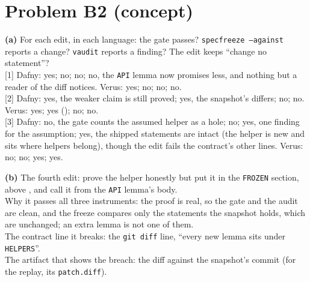 \documentclass[11pt]{article}
\begin{document}
\section*{Problem B2 (concept)}\label{ans:B2}
\begin{answer}
\textbf{(a)} For each edit, in each language: the gate passes? \texttt{specfreeze
--against} reports a change? \texttt{vaudit} reports a finding? The edit keeps
``change no statement''? \\
{[1]} Dafny: yes; no; no; no, the \texttt{API} lemma now promises less, and
nothing but a reader of the diff notices. \quad Verus: yes; no; no; no. \\
{[2]} Dafny: yes, the weaker claim is still proved; yes, the snapshot's
 differs; no; no. \quad Verus: yes; yes ();
no; no. \\
{[3]} Dafny: no, the gate counts the assumed helper as a hole; no; yes, one
finding for the assumption; yes, the shipped statements are intact (the helper
is new and sits where helpers belong), though the edit fails the contract's
other lines. \quad Verus: no; no; yes; yes.

\textbf{(b)} The fourth edit: prove the helper honestly but put it in the
\texttt{FROZEN} section, above , and call it from the
\texttt{API} lemma's body. \\
Why it passes all three instruments: the proof is real, so the gate and the
audit are clean, and the freeze compares only the statements the snapshot
holds, which are unchanged; an extra lemma is not one of them. \\
The contract line it breaks: the \texttt{git diff} line, ``every new lemma
sits under \texttt{HELPERS}''. \\
The artifact that shows the breach: the diff against the snapshot's commit
(for the replay, its \texttt{patch.diff}).
\end{answer}

\end{document}
